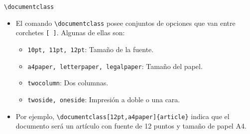 \documentclass[12pt]{beamer}
\begin{document}
\begin{frame}{\texttt{\textbackslash documentclass}}
  \begin{itemize}
    \item<1-> El comando {\color{blue}\texttt{\textbackslash documentclass}} posee conjuntos de opciones que van entre corchetes {\color{blue}\texttt{[ ]}}. Algunas de ellas son:
    \begin{itemize}
      \item {\color{blue}\texttt{10pt, 11pt, 12pt}}: Tamaño de la fuente.
      \item<2-> {\color{blue}\texttt{a4paper, letterpaper, legalpaper}}: Tamaño del papel.
      \item<3-> {\color{blue}\texttt{twocolumn}}: Dos columnas.
      \item<4-> {\color{blue}\texttt{twoside, oneside}}: Impresión a doble o una cara.
    \end{itemize}
    \item<5-> Por ejemplo, {\color{blue}\texttt{\textbackslash documentclass[12pt,a4paper]\{article\}}} indica que el documento será un artículo con fuente
    de 12 puntos y tamaño de papel A4.
  \end{itemize}
\end{frame}
\end{document}
